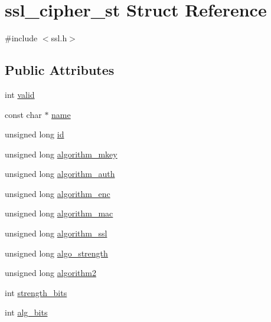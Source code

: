 \hypertarget{structssl__cipher__st}{\section{ssl\-\_\-cipher\-\_\-st Struct Reference}
\label{structssl__cipher__st}
}


{\ttfamily \#include $<$ssl.\-h$>$}

\subsection*{Public Attributes}
\begin{DoxyCompactItemize}
\item 
int \hyperlink{structssl__cipher__st_aaf30c2f1483a5dfcf39a507efb2bacf7}{valid}
\item 
const char $\ast$ \hyperlink{structssl__cipher__st_a860dfffdc51bcbb32da3a3cbae116289}{name}
\item 
unsigned long \hyperlink{structssl__cipher__st_a65f32a2ae5d5696986ecd0195eb29450}{id}
\item 
unsigned long \hyperlink{structssl__cipher__st_ab29b842f135c00b0ae7e34fade97893f}{algorithm\-\_\-mkey}
\item 
unsigned long \hyperlink{structssl__cipher__st_a43b013ec206a5c93d2de55b0e2848cf7}{algorithm\-\_\-auth}
\item 
unsigned long \hyperlink{structssl__cipher__st_a3c592f9eb460fc02b91ce59485324546}{algorithm\-\_\-enc}
\item 
unsigned long \hyperlink{structssl__cipher__st_a6de1434594cf53106b54f0368bfbcf32}{algorithm\-\_\-mac}
\item 
unsigned long \hyperlink{structssl__cipher__st_ae343755fd0c58e74c5e03d41aaccae09}{algorithm\-\_\-ssl}
\item 
unsigned long \hyperlink{structssl__cipher__st_a7c6a3fecb3d246870ccb803260dc2b51}{algo\-\_\-strength}
\item 
unsigned long \hyperlink{structssl__cipher__st_aef80da6412c4e1fec8458c3c244d69e8}{algorithm2}
\item 
int \hyperlink{structssl__cipher__st_ae3a40fb67452514df7770e334a99c32d}{strength\-\_\-bits}
\item 
int \hyperlink{structssl__cipher__st_a451f084cd7c875897f5986a35a482628}{alg\-\_\-bits}
\end{DoxyCompactItemize}


